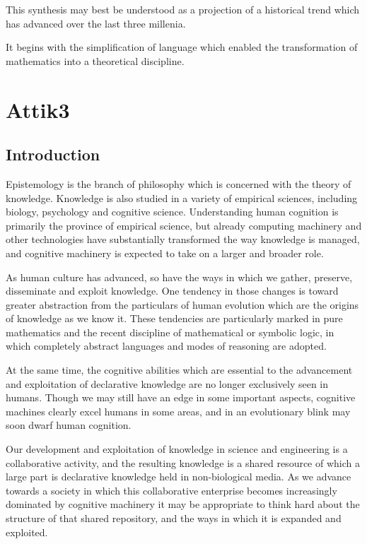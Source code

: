 \documentclass[10pt,titlepage]{book}
\begin{document}
 This synthesis may best be understood as a projection of a historical trend which has advanced over the last three millenia.

 It begins with the simplification of language which enabled the transformation of mathematics into a theoretical discipline.


\chapter{Attik3}

\section{Introduction}
Epistemology is the branch of philosophy which is concerned with the theory of knowledge.
Knowledge is also studied in a variety of empirical sciences, including biology, psychology and cognitive science.
Understanding human cognition is primarily the province of empirical science, but already computing machinery and other technologies have substantially transformed the way knowledge is managed, and cognitive machinery is expected to take on a larger and broader role.

As human culture has advanced, so have the ways in which we gather, preserve, disseminate and exploit knowledge.
One tendency in those changes is toward greater abstraction from the particulars of human evolution which are the origins of knowledge as we know it.
These tendencies are particularly marked in pure mathematics and the recent discipline of mathematical or symbolic logic, in which completely abstract languages and modes of reasoning are adopted.

At the same time, the cognitive abilities which are essential to the advancement and exploitation of declarative knowledge are no longer exclusively seen in humans.
Though we may still have an edge in some important aspects, cognitive machines clearly excel humans in some areas, and in an evolutionary blink may soon dwarf human cognition.

Our development and exploitation of knowledge in science and engineering is a collaborative activity, and the resulting knowledge is a shared resource of which a large part is declarative knowledge held in non-biological media.
As we advance towards a society in which this collaborative enterprise becomes increasingly dominated by cognitive machinery it may be appropriate to think hard about the structure of that shared repository, and the ways in which it is expanded and exploited.
\end{document}
